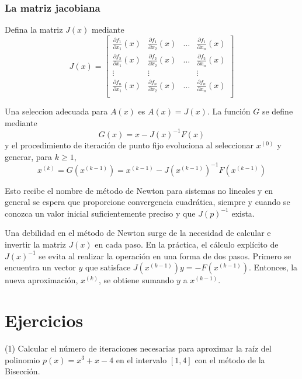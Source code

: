 \subsubsection{La matriz jacobiana}
Defina la matriz $J(x)$ mediante
\begin{equation}
    J(x) = 
    \begin{bmatrix}
        \frac{\partial f_1}{\partial x_1} (x) & \frac{\partial f_1}{\partial x_2} (x) & \dots & \frac{\partial f_1}{\partial x_n} (x) \\
        \frac{\partial f_2}{\partial x_1} (x) & \frac{\partial f_2}{\partial x_2} (x) & \dots & \frac{\partial f_2}{\partial x_n} (x) \\
        \vdots & \vdots & & \vdots \\
        \frac{\partial f_n}{\partial x_1} (x) & \frac{\partial f_n}{\partial x_2} (x) & \dots & \frac{\partial f_n}{\partial x_n} (x) \\
    \end{bmatrix}
\end{equation}

Una seleccion adecuada para $A(x)$ es $A(x) = J(x)$. La función $G$ se define mediante
\[ G(x) = x - J(x)^{-1} F(x) \]
y el procedimiento de iteración de punto fijo evoluciona al seleccionar $x^{(0)}$ y generar, para $k \geq 1$,
\begin{equation}
    x^{(k)} = G(x^{(k - 1)}) = x^{(k-1)} - J(x^{(k-1)})^{-1} F(x^{(k-1)})
\end{equation}

Esto recibe el nombre de método de Newton para sistemas no lineales y en general se espera que proporcione convergencia cuadrática, siempre y cuando se conozca un valor inicial suficientemente preciso y que $J(p)^{-1}$ exista.

Una debilidad en el método de Newton surge de la necesidad de calcular e invertir la matriz $J(x)$ en cada paso. En la práctica, el cálculo explícito de $J(x)^{-1}$ se evita al realizar la operación en una forma de dos pasos. Primero se encuentra un vector $y$ que satisface $J(x^{(k - 1)})y = -F(x^{(k - 1)})$. Entonces, la nueva aproximación, $x^{(k)}$, se obtiene sumando $y$ a $x^{(k - 1)}$.

\section*{Ejercicios}
\noindent (1) Calcular el número de iteraciones necesarias para aproximar la raíz del polinomio $p(x) = x^3 + x - 4$ en el intervalo $[1, 4]$ con el método de la Bisección.

